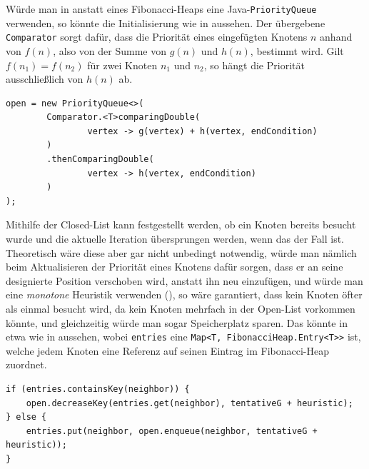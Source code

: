                 Würde man in  anstatt eines Fibonacci-Heaps eine Java-\lstinline{PriorityQueue} verwenden, so könnte die Initialisierung wie in  aussehen. Der übergebene \lstinline{Comparator} sorgt dafür, dass die Priorität eines eingefügten Knotens $n$ anhand von $f(n)$, also von der Summe von $g(n)$ und $h(n)$, bestimmt wird. Gilt $f(n_1) = f(n_2)$ für zwei Knoten $n_1$ und $n_2$, so hängt die Priorität ausschließlich von $h(n)$ ab.
    
                \begin{lstlisting}[caption=Priority-Queue mit Comparator für Best-first search, label=lst:priority-queue]
open = new PriorityQueue<>(
        Comparator.<T>comparingDouble(
                vertex -> g(vertex) + h(vertex, endCondition)
        )
        .thenComparingDouble(
                vertex -> h(vertex, endCondition)
        )
);
                \end{lstlisting}

                Mithilfe der Closed-List kann festgestellt werden, ob ein Knoten bereits besucht wurde und die aktuelle Iteration übersprungen werden, wenn das der Fall ist. Theoretisch wäre diese aber gar nicht unbedingt notwendig, würde man nämlich beim Aktualisieren der Priorität eines Knotens dafür sorgen, dass er an seine designierte Position verschoben wird, anstatt ihn neu einzufügen, und würde man eine \emph{monotone} Heuristik verwenden (), so wäre garantiert, dass kein Knoten öfter als einmal besucht wird, da kein Knoten mehrfach in der Open-List vorkommen könnte, und gleichzeitig würde man sogar Speicherplatz sparen. Das könnte in etwa wie in  aussehen, wobei \lstinline{entries} eine \lstinline{Map<T, FibonacciHeap.Entry<T>>} ist, welche jedem Knoten eine Referenz auf seinen Eintrag im Fibonacci-Heap zuordnet.
             
                \begin{lstlisting}[caption=Aktualisierung der Prioritäten ohne Knoten mehrfach einzufügen, label=lst:open-decrease-key]
if (entries.containsKey(neighbor)) {
    open.decreaseKey(entries.get(neighbor), tentativeG + heuristic);
} else {
    entries.put(neighbor, open.enqueue(neighbor, tentativeG + heuristic));
}
                \end{lstlisting}

